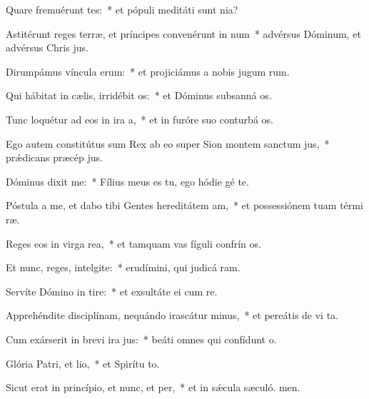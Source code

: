 \item Quare fremuérunt tes:~* et pópuli meditáti sunt nia?
\item Astitérunt reges terræ, et príncipes convenérunt in num~* advérsus Dóminum, et advérsus Chris jus.
\item Dirumpámus víncula erum:~* et projiciámus a nobis jugum rum.
\item Qui hábitat in cælis, irridébit os:~* et Dóminus subsanná os.
\item Tunc loquétur ad eos in ira a,~* et in furóre suo conturbá os.
\item Ego autem constitútus sum Rex ab eo super Sion montem sanctum jus,~* prǽdicans præcép jus.
\item Dóminus dixit  me:~* Fílius meus es tu, ego hódie gé te.
\item Póstula a me, et dabo tibi Gentes hereditátem am,~* et possessiónem tuam térmi ræ.
\item Reges eos in virga rea,~* et tamquam vas fíguli confrín os.
\item Et nunc, reges, intelgite:~* erudímini, qui judicá ram.
\item Servíte Dómino in tire:~* et exsultáte ei cum re.
\item Apprehéndite disciplínam, nequándo irascátur minus,~* et pereátis de vi ta.
\item Cum exárserit in brevi ira jus:~* beáti omnes qui confídunt  o.
\item Glória Patri, et lio,~* et Spirítu to.
\item Sicut erat in princípio, et nunc, et per,~* et in sǽcula sæculó. men.
